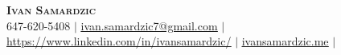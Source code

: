 \begin{center}
	\textbf{\Huge \scshape Ivan Samardzic} \\ \vspace{1pt}
	\small 647-620-5408 $|$
    \href{mailto:ivan.samardzic7@gmail.com}{\underline{ivan.samardzic7@gmail.com}} $|$
	\href{https://www.linkedin.com/in/ivansamardzic/}{\underline{https://www.linkedin.com/in/ivansamardzic/}} $|$
	\href{https://www.ivansamardzic.me}{\underline{ivansamardzic.me}} $|$

\end{center}
